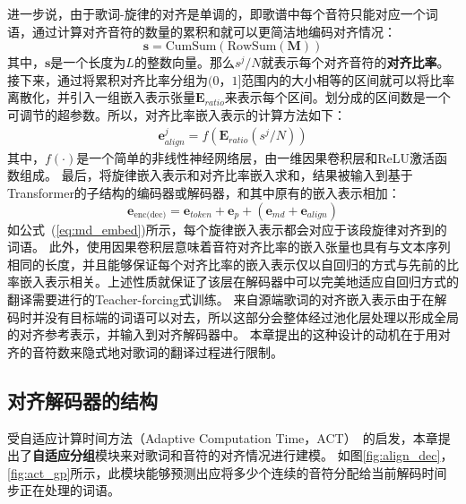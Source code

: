 进一步说，由于歌词-旋律的对齐是单调的，即歌谱中每个音符只能对应一个词语，通过计算对齐音符的数量的累积和就可以更简洁地编码对齐情况：
\begin{equation}
\label{eq:cumsum}
    \mathbf{s} = \text{CumSum}(\text{RowSum}(\mathbf{M}))
\end{equation}
其中，$\mathbf{s}$是一个长度为$L$的整数向量。那么$s^j / N$就表示每个对齐音符的\textbf{对齐比率}。
接下来，通过将累积对齐比率分组为$(0，1]$范围内的大小相等的区间就可以将比率离散化，并引入一组嵌入表示张量$\mathbf{E}_{ratio}$来表示每个区间。划分成的区间数是一个可调节的超参数。所以，对齐比率嵌入表示的计算方法如下：
\begin{align}
\label{eq:align}
    \mathbf{e}_{align}^j = f(\mathbf{E}_{ratio}(s^j / N))
\end{align}
其中，$f(\cdot)$是一个简单的非线性神经网络层，由一维因果卷积层和ReLU激活函数组成。
最后，将旋律嵌入表示和对齐比率嵌入求和，结果被输入到基于Transformer的子结构的编码器或解码器，和其中原有的嵌入表示相加：
\begin{equation}
\label{eq:embed}
    \mathbf{e}_{\text{enc(dec)}} = \mathbf{e}_{token} + \mathbf{e}_p + (\mathbf{e}_{md} + \mathbf{e}_{align})
\end{equation}
如公式~(\ref{eq:md_embed})所示，每个旋律嵌入表示都会对应于该段旋律对齐到的词语。
此外，使用因果卷积层意味着音符对齐比率的嵌入张量也具有与文本序列相同的长度，并且能够保证每个对齐比率的嵌入表示仅以自回归的方式与先前的比率嵌入表示相关。上述性质就保证了该层在解码器中可以完美地适应自回归方式的翻译需要进行的Teacher-forcing式训练。
来自源端歌词的对齐嵌入表示由于在解码时并没有目标端的词语可以对去，所以这部分会整体经过池化层处理以形成全局的对齐参考表示，并输入到对齐解码器中。
本章提出的这种设计的动机在于用对齐的音符数来隐式地对歌词的翻译过程进行限制。

\subsection{对齐解码器的结构}
受自适应计算时间方法（Adaptive Computation Time，ACT）~\citep{act}的启发，本章提出了\textbf{自适应分组}模块来对歌词和音符的对齐情况进行建模。
如图\ref{fig:align_dec}，\ref{fig:act_gp}所示，此模块能够预测出应将多少个连续的音符分配给当前解码时间步正在处理的词语。
